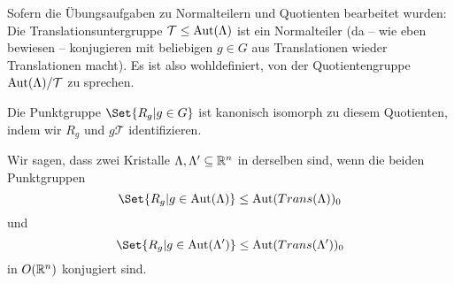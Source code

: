 \begin{remark}
Sofern die Übungsaufgaben zu Normalteilern und Quotienten bearbeitet wurden: Die Translationsuntergruppe $\mathcal{T}\leq\operatorname{Aut}(\Lambda)$ ist ein Normalteiler (da -- wie eben bewiesen -- konjugieren mit beliebigen $g\in G$ aus Translationen wieder Translationen macht). Es ist also wohldefiniert, von der Quotientengruppe $\operatorname{Aut}(\Lambda) / \mathcal{T}$ zu sprechen.

Die Punktgruppe $\Set{R_g | g\in G}$ ist kanonisch isomorph zu diesem Quotienten, indem wir $R_g$ und $g\mathcal{T}$ identifizieren.
\end{remark}

\begin{definition}[Kristallklassen]
Wir sagen, dass zwei Kristalle $\Lambda,\Lambda'\subseteq\mathbb{R}^n$ in derselben  sind, wenn die beiden Punktgruppen
\[\Set{R_g | g\in\Aut(\Lambda)} \leq \Aut(Trans(\Lambda))_0 \]
und
\[\Set{R_g | g\in\Aut(\Lambda')} \leq \Aut(Trans(\Lambda'))_0 \]
in $O(\mathbb{R}^n)$ konjugiert sind.
\end{definition}


